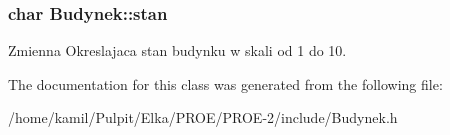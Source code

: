 \subsubsection[{stan}]{\setlength{\rightskip}{0pt plus 5cm}char Budynek\+::stan\hspace{0.3cm}{\ttfamily [protected]}}\label{class_budynek_a790ff1e35e2c213152c6436fbb6ee285}

\begin{DoxyItemize}
\item Zmienna Okreslajaca stan budynku w skali od 1 do 10. 
\end{DoxyItemize}

The documentation for this class was generated from the following file\+:\begin{DoxyCompactItemize}
\item 
/home/kamil/\+Pulpit/\+Elka/\+P\+R\+O\+E/\+P\+R\+O\+E-\/2/include/Budynek.\+h\end{DoxyCompactItemize}
